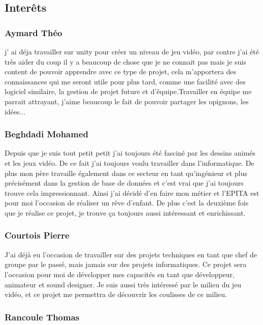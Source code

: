 \documentclass[10pt]{article} %
\begin{document}
\subsection{Interêts\\}



\subsubsection{Aymard Théo}

j' ai déja travailler sur unity pour créer un niveau de jeu vidéo, par contre j'ai été très aider du coup il y a beaucoup de chose que je ne connait pas mais je suis content de pouvoir apprendre avec ce type de projet, cela m'apportera des connaissances qui me seront utile pour plus tard, comme une facilité avec des logiciel similaire, la gestion de projet future et d'équipe.Travailler en équipe me parrait attrayant, j'aime beaucoup le fait de pouvoir partager les opignons, les idées...        
   
\subsubsection{Beghdadi Mohamed}

Depuis que je suis tout petit petit j'ai toujours été fasciné par les dessins animés et les jeux vidéo. De ce fait j'ai toujours voulu travailler dans l'informatique. De plus  mon père travaille également  dans ce secteur en tant qu'ingénieur et plus précisément dans la gestion de base de données et c’est vrai que j’ai toujours trouve cela impressionnant. Ainsi j’ai décidé d’en faire mon métier et l’EPITA est pour moi l’occasion de réaliser un rêve d’enfant. De plus c’est la deuxième fois que je réalise ce projet, je trouve ça toujours aussi intéressant et enrichissant.

\subsubsection{Courtois Pierre}

J'ai déjà eu l'occasion de travailler sur des projets techniques en tant que chef de groupe par le passé, mais jamais sur des projets informatiques. Ce projet sera l'occasion pour moi de développer mes capacités en tant que développeur, animateur et sound designer. Je suis aussi très intéressé par le milieu du jeu vidéo, et ce projet me permettra de découvrir les coulisses de ce milieu.

\subsubsection{Rancoule Thomas}
\end{document}
